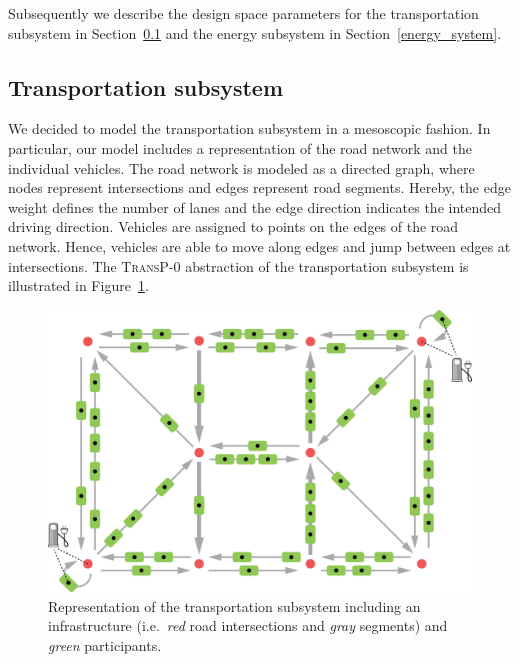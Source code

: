 Subsequently we describe the design space parameters for the transportation subsystem in Section~\ref{transport} and the energy subsystem in Section~\ref{energy_system}.

\subsection{Transportation subsystem}
\label{transport}

We decided to model the transportation subsystem in a mesoscopic fashion. In particular, our model includes a representation of the road network and the individual vehicles. The road network is modeled as a directed graph, where nodes represent intersections and edges represent road segments. Hereby, the edge weight defines the number of lanes and the edge direction indicates the intended driving direction.
Vehicles are assigned to points on the edges of the road network. Hence, vehicles are able to move along edges and jump between edges at intersections. The \textsc{TransP-0} abstraction of the transportation subsystem is illustrated in Figure~\ref{transport_illustration}.

\begin{figure}[h]
	\begin{center}
	\includegraphics[trim=0 6 0 21, width=.825\columnwidth]{./gfx/transportation_system.png}
	\caption{Representation of the transportation subsystem including an infrastructure (i.e.\ \textit{red} road intersections and \textit{gray} segments) and \textit{green} participants.}
	\label{transport_illustration}
	\end{center}
\end{figure}

